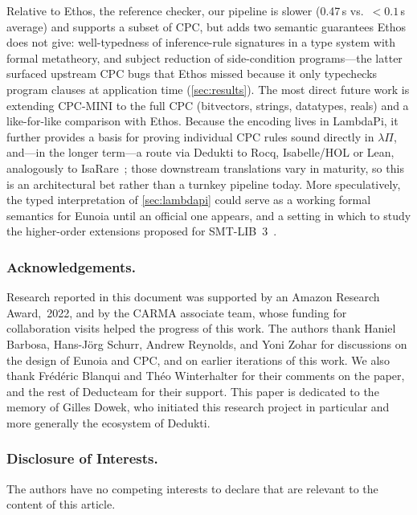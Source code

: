\documentclass{llncs}
\begin{document}
Relative to Ethos, the reference checker, our
pipeline is slower (0.47\,s vs.\ ${<}0.1$\,s
average) and supports a subset of CPC, but adds two
semantic guarantees Ethos does not give:
well-typedness of inference-rule signatures in a
type system with formal metatheory, and subject
reduction of side-condition programs---the latter
surfaced upstream CPC bugs that Ethos missed because
it only typechecks program clauses at application
time (\autoref{sec:results}).
The most direct future work is extending CPC-MINI
to the full CPC (bitvectors, strings, datatypes,
reals) and a like-for-like comparison with Ethos.
Because the encoding lives in LambdaPi, it further
provides a basis for proving individual CPC rules
sound directly in $λΠ$, and---in the longer
term---a route via Dedukti to Rocq, Isabelle/HOL or
Lean, analogously to
IsaRare~\cite{lachnitt24isarare}; those downstream
translations vary in maturity, so this is an
architectural bet rather than a turnkey pipeline
today.
More speculatively, the typed interpretation of
\autoref{sec:lambdapi} could serve as a working
formal semantics for Eunoia until an official one
appears, and a setting in which to study the
higher-order extensions proposed for
SMT-LIB~3~\cite{barrettSMTLIB3Bringing,smt3-proposal}.

\subsubsection*{Acknowledgements.}
%
Research reported in this document was supported by an
Amazon Research Award,~2022, and by the CARMA associate
team, whose funding for collaboration visits helped the
progress of this work.
%
The authors thank Haniel Barbosa,
Hans-Jörg Schurr, Andrew Reynolds, and Yoni Zohar
for discussions on the design of Eunoia and CPC, and
on earlier iterations of this work.
%
We also thank Frédéric Blanqui and Théo Winterhalter for
their comments on the paper, and the rest of Deducteam
for their support.
%
This paper is dedicated to the memory of Gilles Dowek,
who initiated this research project in particular and
more generally the ecosystem of Dedukti.

\subsubsection*{Disclosure of Interests.}
The authors have no competing interests to declare
that are relevant to the content of this article.

\printbibliography
\end{document}
